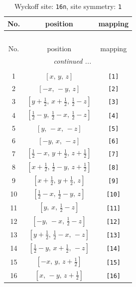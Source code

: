 \documentclass[fleqn,8pt]{jsarticle}
\begin{document}
\begin{longtable}{ccc}
\caption{Wyckoff site: {\tt 16n}, site symmetry: {\tt 1}}
 \\
 \hline \hline
No. & position & mapping \\ \hline \endfirsthead

\multicolumn{2}{l}{\tablename\ \thetable{}} \\
 \hline \hline
No. & position & mapping \\ \hline \endhead

 \hline \hline
\multicolumn{2}{r}{\footnotesize\it continued ...} \\ \endfoot

 \hline \hline
\multicolumn{2}{r}{} \\ \endlastfoot

1 & $\left[ x,\, y,\, z \right]$ & {\tt [1]} \\ \hline
2 & $\left[ - x,\, - y,\, z \right]$ & {\tt [2]} \\ \hline
3 & $\left[ y + \frac{1}{2},\, x + \frac{1}{2},\, \frac{1}{2} - z \right]$ & {\tt [3]} \\ \hline
4 & $\left[ \frac{1}{2} - y,\, \frac{1}{2} - x,\, \frac{1}{2} - z \right]$ & {\tt [4]} \\ \hline
5 & $\left[ y,\, - x,\, - z \right]$ & {\tt [5]} \\ \hline
6 & $\left[ - y,\, x,\, - z \right]$ & {\tt [6]} \\ \hline
7 & $\left[ \frac{1}{2} - x,\, y + \frac{1}{2},\, z + \frac{1}{2} \right]$ & {\tt [7]} \\ \hline
8 & $\left[ x + \frac{1}{2},\, \frac{1}{2} - y,\, z + \frac{1}{2} \right]$ & {\tt [8]} \\ \hline
9 & $\left[ x + \frac{1}{2},\, y + \frac{1}{2},\, z \right]$ & {\tt [9]} \\ \hline
10 & $\left[ \frac{1}{2} - x,\, \frac{1}{2} - y,\, z \right]$ & {\tt [10]} \\ \hline
11 & $\left[ y,\, x,\, \frac{1}{2} - z \right]$ & {\tt [11]} \\ \hline
12 & $\left[ - y,\, - x,\, \frac{1}{2} - z \right]$ & {\tt [12]} \\ \hline
13 & $\left[ y + \frac{1}{2},\, \frac{1}{2} - x,\, - z \right]$ & {\tt [13]} \\ \hline
14 & $\left[ \frac{1}{2} - y,\, x + \frac{1}{2},\, - z \right]$ & {\tt [14]} \\ \hline
15 & $\left[ - x,\, y,\, z + \frac{1}{2} \right]$ & {\tt [15]} \\ \hline
16 & $\left[ x,\, - y,\, z + \frac{1}{2} \right]$ & {\tt [16]} \\
\end{longtable}
\end{document}
